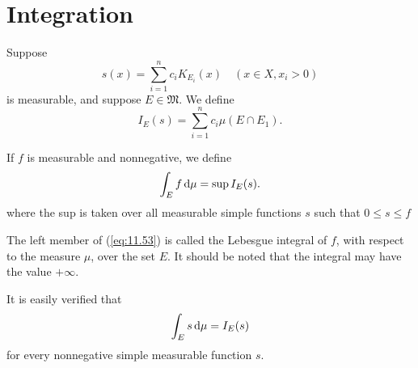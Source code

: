 
\section{Integration}

\begin{mydef}
    \label{mydef:11.21}
    Suppose
    \begin{equation}
        \label{eq:11.51}
        s(x) = \sum_{i=1}^{n} c_i K_{E_i} (x)
        \quad (x \in X, x_i > 0)
    \end{equation}
    is measurable,
    and suppose $E \in \mathfrak{M}$.
    We define
    \begin{equation}
        \label{eq:11.52}
        I_E(s) =
        \sum_{i=1}^{n} c_i \mu \left( E \cap E_1 \right) .
    \end{equation}

    If $f$ is measurable and nonnegative,
    we define
    \begin{equation}
        \label{eq:11.53}
        \int_E f \d \mu =
        \sup I_E (s).
    \end{equation}
    where the sup is taken over all measurable simple functions $s$ such that $0 \leq s \leq f$

    The left member of (\ref{eq:11.53}) is called the Lebesgue integral of $f$, with respect to the measure $\mu$, over the set $E$.
    It should be noted that the integral may have the value $+ \infty$.

    It is easily verified that
    \begin{equation}
        \label{eq:11.54}
        \int_E s \d \mu =
        I_E (s)
    \end{equation}
    for every nonnegative simple measurable function $s$.
\end{mydef}

